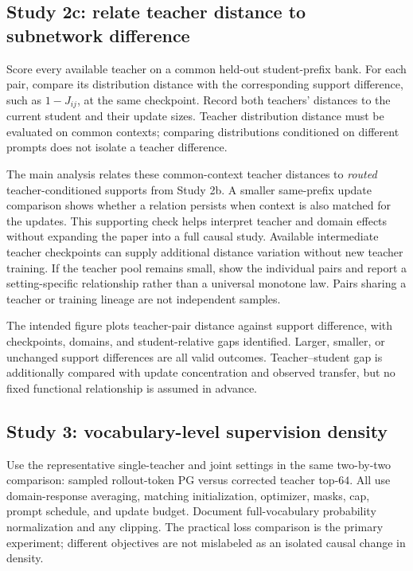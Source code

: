 \subsection{Study 2c: relate teacher distance to subnetwork difference}

Score every available teacher on a common held-out student-prefix bank.
For each pair, compare its distribution distance with the corresponding
support difference, such as $1-J_{ij}$, at the same checkpoint. Record
both teachers' distances to the current student and their update sizes.
Teacher distribution distance must be evaluated on common contexts;
comparing distributions conditioned on different prompts does not
isolate a teacher difference.

The main analysis relates these common-context teacher distances to
\emph{routed} teacher-conditioned supports from Study 2b. A smaller
same-prefix update comparison shows whether a relation persists when
context is also matched for the updates. This supporting check helps
interpret teacher and domain effects without expanding the paper into
a full causal study. Available intermediate teacher checkpoints can
supply additional distance variation without new teacher training.
If the teacher pool remains small, show the individual pairs and report
a setting-specific relationship rather than a universal monotone law.
Pairs sharing a teacher or training lineage are not independent samples.

The intended figure plots teacher-pair distance against support
difference, with checkpoints, domains, and student-relative gaps
identified. Larger, smaller, or unchanged support differences are all
valid outcomes. Teacher--student gap is additionally compared with
update concentration and observed transfer, but no fixed functional
relationship is assumed in advance.

\subsection{Study 3: vocabulary-level supervision density}

Use the representative single-teacher and joint settings in the
same two-by-two comparison: sampled rollout-token PG versus corrected
teacher top-$64$. All use domain-response averaging, matching
initialization, optimizer, masks, cap, prompt schedule, and update budget.
Document full-vocabulary probability normalization and any clipping.
The practical loss comparison is the primary experiment; different
objectives are not mislabeled as an isolated causal change in density.

